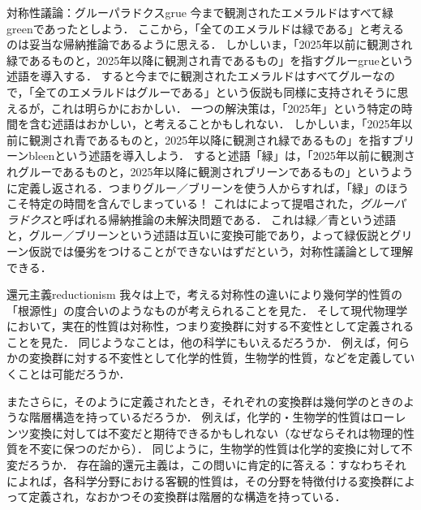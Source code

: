 \documentclass[11pt,a4paper, dvipdfmx]{jsarticle}
\begin{document}
\begin{rei}{対称性議論：グルーパラドクス}{grue}
今まで観測されたエメラルドはすべて緑greenであったとしよう．
ここから，「全てのエメラルドは緑である」と考えるのは妥当な帰納推論であるように思える．
しかしいま，「2025年以前に観測され緑であるものと，2025年以降に観測され青であるもの」を指すグルーgrueという述語を導入する．
すると今までに観測されたエメラルドはすべてグルーなので，「全てのエメラルドはグルーである」という仮説も同様に支持されそうに思えるが，これは明らかにおかしい．
一つの解決策は，「2025年」という特定の時間を含む述語はおかしい，と考えることかもしれない．
しかしいま，「2025年以前に観測され青であるものと，2025年以降に観測され緑であるもの」を指すブリーンbleenという述語を導入しよう．
すると述語「緑」は，「2025年以前に観測されグルーであるものと，2025年以降に観測されブリーンであるもの」というように定義し返される．つまりグルー／ブリーンを使う人からすれば，「緑」のほうこそ特定の時間を含んでしまっている！
これは\cite{Goodman1955-nr}によって提唱された，\emph{グルーパラドクス}と呼ばれる帰納推論の未解決問題である．
これは緑／青という述語と，グルー／ブリーンという述語は互いに変換可能であり，よって緑仮説とグリーン仮説では優劣をつけることができないはずだという，対称性議論として理解できる．
\end{rei}

\begin{rei}{還元主義}{reductionism}
我々は上で，考える対称性の違いにより幾何学的性質の「根源性」の度合いのようなものが考えられることを見た．
そして現代物理学において，実在的性質は対称性，つまり変換群に対する不変性として定義されることを見た．
同じようなことは，他の科学にもいえるだろうか．
例えば，何らかの変換群に対する不変性として化学的性質，生物学的性質，などを定義していくことは可能だろうか．

またさらに，そのように定義されたとき，それぞれの変換群は幾何学のときのような階層構造を持っているだろうか．
例えば，化学的・生物学的性質はローレンツ変換に対しては不変だと期待できるかもしれない（なぜならそれは物理的性質を不変に保つのだから）．
同じように，生物学的性質は化学的変換に対して不変だろうか．
存在論的還元主義は，この問いに肯定的に答える：すなわちそれによれば，各科学分野における客観的性質は，その分野を特徴付ける変換群によって定義され，なおかつその変換群は階層的な構造を持っている．
\end{rei}






\end{document}
